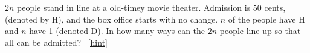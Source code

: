 \documentclass{book}
\begin{document}
\setcounter{project}{173}
\addtocounter{project}{-1}
\begin{activity}[]\label{act-hdseq}
\hypertarget{p-1033}{}%
\(2n\) people stand in line at a old-timey movie theater. Admission is 50 cents, (denoted by H), and the box office starts with no change. \(n\) of the people have H and \(n\) have \textdollar{}1 (denoted D). In how many ways can the \(2n\) people line up so that all can be admitted?%
~\hfill{\tiny\hyperlink{a-173}{[hint]}\hypertarget{q-173}{}}\end{activity}
\end{document}
